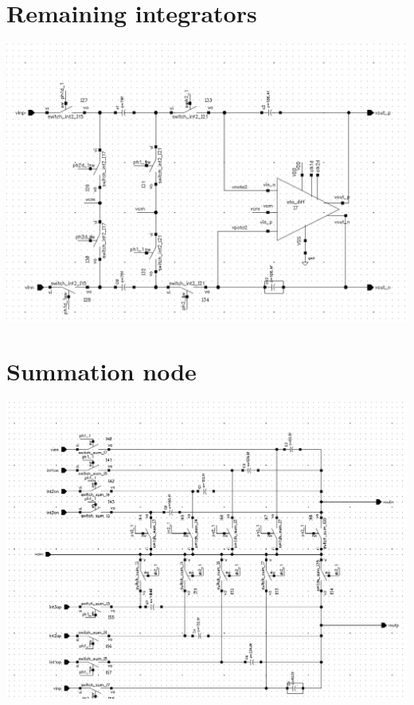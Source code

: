 \begin{appendices}
\section{Remaining integrators}
\label{app:integrator_rest}
\begin{center}
\includegraphics[width=\textwidth]{images/integrator_2.png}
\end{center}

\section{Summation node}
\label{app:sum}
\begin{center}
\includegraphics[width=\textwidth]{images/sum_block.png}
\end{center}


\end{appendices}
